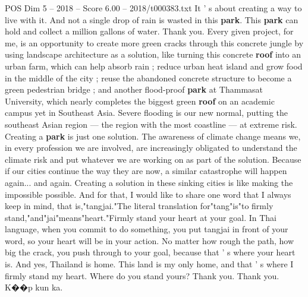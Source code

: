 \begin{textsample}{POS Dim 5 – 2018 – Score 6.00 – 2018/t000383.txt}
It ' s about creating a way to live with it.
And not a single drop of rain is wasted in this \textbf{park}.
This \textbf{park} can hold and collect a million gallons of water.
Thank you.
Every given project, for me, is an opportunity to create more green cracks through this concrete jungle by using landscape architecture as a solution, like turning this concrete \textbf{roof} into an urban farm, which can help absorb rain ; reduce urban heat island and grow food in the middle of the city ; reuse the abandoned concrete structure to become a green pedestrian bridge ; and another flood-proof \textbf{park} at Thammasat University, which nearly completes the biggest green \textbf{roof} on an academic campus yet in Southeast Asia.
Severe flooding is our new normal, putting the southeast Asian region — the region with the most coastline — at extreme risk.
Creating a \textbf{park} is just one solution.
The awareness of climate change means we, in every profession we are involved, are increasingly obligated to understand the climate risk and put whatever we are working on as part of the solution.
Because if our cities continue the way they are now, a similar catastrophe will happen again... and again.
Creating a solution in these sinking cities is like making the impossible possible.
And for that, I would like to share one word that I always keep in mind, that is,"tangjai."The literal translation for"tang"is"to firmly stand,"and"jai"means"heart."Firmly stand your heart at your goal.
In Thai language, when you commit to do something, you put tangjai in front of your word, so your heart will be in your action.
No matter how rough the path, how big the crack, you push through to your goal, because that ' s where your heart is.
And yes, Thailand is home.
This land is my only home, and that ' s where I firmly stand my heart.
Where do you stand yours?
Thank you.
Thank you.
K{\EmojiFont �}{\EmojiFont �}p kun ka.

\end{textsample}
